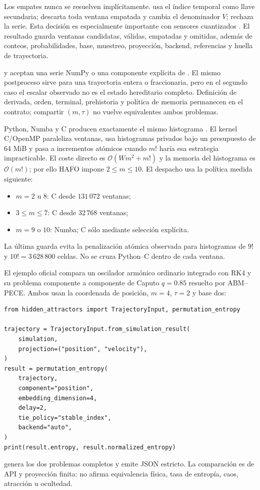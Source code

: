 Los empates nunca se resuelven implícitamente.  usa el
índice temporal como llave secundaria;  descarta toda ventana
empatada y cambia el denominador $V$;  rechaza la serie. Esta
decisión es especialmente importante con sensores cuantizados
\cite{TraversaroEtAl2018TiedValues}. El resultado guarda ventanas candidatas,
válidas, empatadas y omitidas, además de conteos, probabilidades, base,
muestreo, proyección, backend, referencias y huella de trayectoria.

 y 
aceptan una serie NumPy o una componente explícita de
. El mismo postproceso sirve para una trayectoria
entera o fraccionaria, pero en el segundo caso el escalar observado no es el
estado hereditario completo. Definición de derivada, orden, terminal,
prehistoria y política de memoria permanecen en el contrato; compartir
$(m,\tau)$ no vuelve equivalentes ambos problemas.

Python, Numba y C producen exactamente el mismo histograma .
El kernel C/OpenMP paraleliza ventanas, usa histogramas privados bajo un
presupuesto de 64 MiB y pasa a incrementos atómicos cuando $m!$ haría esa
estrategia impracticable. El coste directo es
$\mathcal O(Wm^2+m!)$ y la memoria del histograma es
$\mathcal O(m!)$; por ello HAFO impone $2\leq m\leq10$. El despacho
 usa la política medida siguiente:
\begin{itemize}
  \item $m=2$ u $8$: C desde $131\,072$ ventanas;
  \item $3\leq m\leq7$: C desde $32\,768$ ventanas;
  \item $m=9$ o $10$: Numba; C sólo mediante selección explícita.
\end{itemize}
La última guarda evita la penalización atómica observada para histogramas de
$9!$ y $10!=3\,628\,800$ celdas. No se cruza Python--C dentro de cada ventana.

El ejemplo oficial compara un oscilador armónico ordinario integrado con RK4
y su problema componente a componente de Caputo $q=0.85$ resuelto por
ABM--PECE. Ambos usan la coordenada de posición, $m=4$, $\tau=2$ y base dos:
\begin{verbatim}
from hidden_attractors import TrajectoryInput, permutation_entropy

trajectory = TrajectoryInput.from_simulation_result(
    simulation,
    projection=("position", "velocity"),
)
result = permutation_entropy(
    trajectory,
    component="position",
    embedding_dimension=4,
    delay=2,
    tie_policy="stable_index",
    backend="auto",
)
print(result.entropy, result.normalized_entropy)
\end{verbatim}
 genera los dos
problemas completos y emite JSON estricto. La comparación es de API y
proyección finita: no afirma equivalencia física, tasa de entropía, caos,
atracción u ocultedad.


